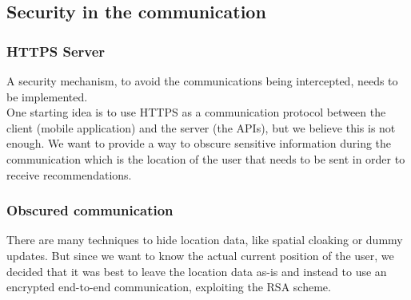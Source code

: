 \documentclass[../../main]{subfiles}
\begin{document}
\subsection{Security in the communication}
\label{ss:security-in-communication}

\subsubsection{HTTPS Server}
A security mechanism, to avoid the communications being intercepted, needs to be implemented.\\
One starting idea is to use HTTPS as a communication protocol between the client (mobile application) and the server (the APIs), but we believe this is not enough.
We want to provide a way to obscure sensitive information during the communication which is the location of the user that needs to be sent in order to receive recommendations.
\subsubsection{Obscured communication}
There are many techniques to hide location data, like spatial cloaking or dummy updates.
But since we want to know the actual current position of the user, we decided that it was best to leave the location data as-is and instead to use an encrypted end-to-end communication, exploiting the RSA scheme.
\end{document}
